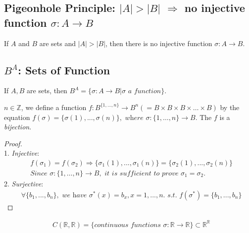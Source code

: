 \documentclass[11pt]{elegantbook}
\begin{document}
\subsection{Pigeonhole Principle: $|A|>|B|$ $\Rightarrow$ no injective function $\sigma:A \rightarrow B$}
\begin{theorem}
    If $A$ and $B$ are sets and $|A|>|B|$, then there is no injective function $\sigma:A \rightarrow B$.
\end{theorem}



\subsection{$B^A$: Sets of Function}
If $A,B$ are sets, then $B^A=\{\sigma:A \rightarrow B| \sigma \textit{ a function}\}$.
\begin{example}
    $n\in \mathbb{Z}$, we define a function $f: B^{\{1,\dots,n\}} \rightarrow B^n(=B\times B\times B\times \dots \times B)$ by the equation
    $f(\sigma)=\{\sigma(1),...,\sigma(n)\}, \textit{ where }\sigma:\{1,\dots,n\} \rightarrow B$. The $f$ is a \textit{bijection}.
\end{example}
\begin{proof}
    \quad\\
    1. \textit{Injective}:
    \begin{equation}
        \begin{aligned}
            &f(\sigma_1)=f(\sigma_2)
            \Rightarrow \{\sigma_1(1),...,\sigma_1(n)\}=\{\sigma_2(1),...,\sigma_2(n)\}\\
            &\textit{Since }\sigma:\{1,\dots,n\} \rightarrow B,\textit{ it is sufficient to prove }\sigma_1=\sigma_2.
        \end{aligned}
        \nonumber
    \end{equation}
    2. \textit{Surjective}:
    \begin{equation}
        \begin{aligned}
            &\forall \{b_1,...,b_n\},\textit{ we have }\sigma^*(x)=b_x,x=1,...,n.\textit{ s.t. }f(\sigma^*)=\{b_1,...,b_n\}
        \end{aligned}
        \nonumber
    \end{equation}

\end{proof}
\begin{example}
    \begin{equation}
        \begin{aligned}
            & C(\mathbb{R},\mathbb{R})=\{\textit{continuous functions }\sigma:\mathbb{R} \rightarrow \mathbb{R} \}\subset \mathbb{R}^\mathbb{R}
        \end{aligned}
        \nonumber
    \end{equation}
\end{example}
\end{document}
